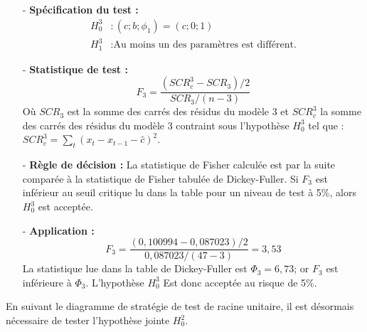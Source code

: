\begin{itemize}
\item[-]\textbf{Spécification du test :} 
\begin{equation*}
    \begin{split}
        H_{0}^{3} &: (c; b; \phi_{1}) = (c;0;1)\\
        H_{1}^{3} &: \text{Au moins un des paramètres est différent.}
    \end{split}
\end{equation*}
\item[-]\textbf{Statistique de test :} 
\begin{equation*}
    F_{3} = \frac{(SCR_{c}^{3} - SCR_{3})/2}{SCR_{3}/(n-3)}
\end{equation*}
Où $SCR_{3}$ est la somme des carrés des résidus du modèle 3 et $SCR_{c}^{3}$ la somme des carrés des résidus du modèle 3 contraint sous l'hypothèse $H_{0}^{3}$ tel que :
$SCR_{c}^{3} = \sum_{t} \left(x_{t} - x_{t-1} - \hat{c}\right)^{2}$.
\item[-]\textbf{Règle de décision :} La statistique de Fisher calculée est par la suite comparée à la statistique de Fisher tabulée de Dickey-Fuller. Si $F_{3}$ est 
inférieur au seuil critique lu dans la table pour un niveau de test à 5\%, alors $H_{0}^{3}$ est acceptée.
\item[-]\textbf{Application :} 
\begin{equation*}
    F_{3} = \frac{(0,100994 -  0,087023)/2}{0,087023/(47-3)} = 3,53
\end{equation*}
La statistique lue dans la table de Dickey-Fuller est $\Phi_{3} = 6,73$; or $F_{3}$ est inférieure à $\Phi_{3}$. L'hypothèse $H_{0}^{3}$ Est donc acceptée au risque 
de 5\%.
\end{itemize}
%
En suivant le diagramme de stratégie de test de racine unitaire, il est désormais nécessaire de tester l'hypothèse jointe $H_{0}^{2}$.
%
